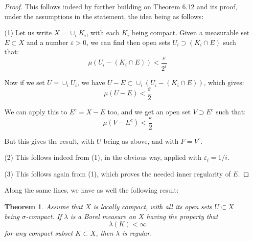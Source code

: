 \documentclass[12pt]{amsbook}
\newtheorem{theorem}{Theorem}[chapter]
\begin{document}
\begin{proof}
This follows indeed by further building on Theorem 6.12 and its proof, under the assumptions in the statement, the idea being as follows:

\medskip

(1) Let us write $X=\cup_i K_i$, with each $K_i$ being compact. Given a measurable set $E\subset X$ and a number $\varepsilon>0$, we can find then open sets $U_i\supset(K_i\cap E)$ such that:
$$\mu\left(U_i-(K_i\cap E)\right)<\frac{\varepsilon}{2^i}$$

Now if we set $U=\cup_iU_i$, we have $U-E\subset\cup_i(U_i-(K_i\cap E))$, which gives:
$$\mu(U-E)<\frac{\varepsilon}{2}$$

We can apply this to $E^c=X-E$ too, and we get an open set $V\supset E^c$ such that:
$$\mu(V-E^c)<\frac{\varepsilon}{2}$$

But this gives the result, with $U$ being as above, and with $F=V^c$.

\medskip

(2) This follows indeed from (1), in the obvious way, applied with $\varepsilon_i=1/i$.

\medskip

(3) This follows again from (1), which proves the needed inner regularity of $E$.
\end{proof}

Along the same lines, we have as well the following result:

\begin{theorem}
Assume that $X$ is locally compact, with all its open sets $U\subset X$ being $\sigma$-compact. If $\lambda$ is a Borel measure on $X$ having the property that
$$\lambda(K)<\infty$$
for any compact subset $K\subset X$, then $\lambda$ is regular.
\end{theorem}
\end{document}
